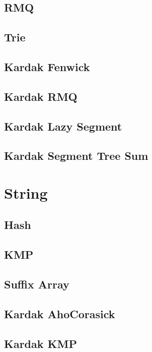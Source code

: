 \documentclass[a4paper,landscape]{article}
\begin{document}
\begin{multicols}{2}
\subsection{RMQ}
	
\subsection{Trie}
	
\subsection{Kardak Fenwick}
	
\subsection{Kardak RMQ}
	
\subsection{Kardak Lazy Segment}
	
\subsection{Kardak Segment Tree Sum}
	


\section{String}
\subsection{Hash}
	
\subsection{KMP}
	
\subsection{Suffix Array}
	
\subsection{Kardak AhoCorasick}
	
\subsection{Kardak KMP}
	

\end{multicols}
\end{document}
